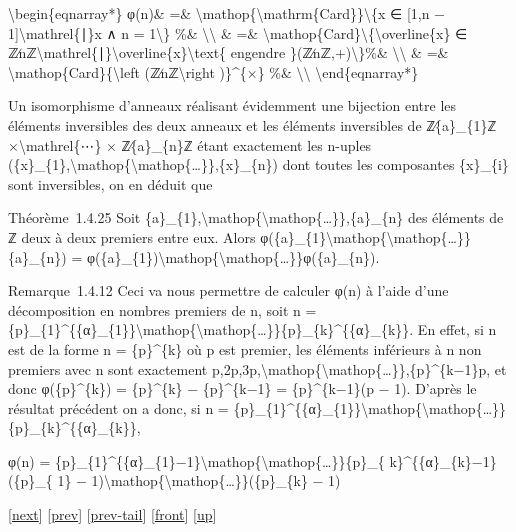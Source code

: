 \documentclass[]{article}
\begin{document}
\textbackslash{}begin\{eqnarray*\} φ(n)\& =\&
\textbackslash{}mathop\{\textbackslash{}mathrm\{Card\}\}\textbackslash{}\{x
∈ {[}1,n − 1{]}\textbackslash{}mathrel\{∣\}x ∧ n = 1\textbackslash{}\}
\%\& \textbackslash{}\textbackslash{} \& =\&
\textbackslash{}mathop\{Card\}\textbackslash{}\{\textbackslash{}overline\{x\}
∈
ℤ∕nℤ\textbackslash{}mathrel\{∣\}\textbackslash{}overline\{x\}\textbackslash{}text\{
engendre \}(ℤ∕nℤ,+)\textbackslash{}\}\%\&
\textbackslash{}\textbackslash{} \& =\&
\textbackslash{}mathop\{Card\}\{\textbackslash{}left
(ℤ∕nℤ\textbackslash{}right )\}\^{}\{×\} \%\&
\textbackslash{}\textbackslash{} \textbackslash{}end\{eqnarray*\}

Un isomorphisme d'anneaux réalisant évidemment une bijection entre les
éléments inversibles des deux anneaux et les éléments inversibles de
ℤ∕\{a\}\_\{1\}ℤ ×\textbackslash{}mathrel\{⋯\} × ℤ∕\{a\}\_\{n\}ℤ étant
exactement les n-uples
(\{x\}\_\{1\},\textbackslash{}mathop\{\textbackslash{}mathop\{\ldots{}\}\},\{x\}\_\{n\})
dont toutes les composantes \{x\}\_\{i\} sont inversibles, on en déduit
que

Théorème~1.4.25 Soit
\{a\}\_\{1\},\textbackslash{}mathop\{\textbackslash{}mathop\{\ldots{}\}\},\{a\}\_\{n\}
des éléments de ℤ deux à deux premiers entre eux. Alors
φ(\{a\}\_\{1\}\textbackslash{}mathop\{\textbackslash{}mathop\{\ldots{}\}\}\{a\}\_\{n\})
=
φ(\{a\}\_\{1\})\textbackslash{}mathop\{\textbackslash{}mathop\{\ldots{}\}\}φ(\{a\}\_\{n\}).

Remarque~1.4.12 Ceci va nous permettre de calculer φ(n) à l'aide d'une
décomposition en nombres premiers de n, soit n =
\{p\}\_\{1\}\^{}\{\{α\}\_\{1\}\}\textbackslash{}mathop\{\textbackslash{}mathop\{\ldots{}\}\}\{p\}\_\{k\}\^{}\{\{α\}\_\{k\}\}.
En effet, si n est de la forme n = \{p\}\^{}\{k\} où p est premier, les
éléments inférieurs à n non premiers avec n sont exactement
p,2p,3p,\textbackslash{}mathop\{\textbackslash{}mathop\{\ldots{}\}\},\{p\}\^{}\{k−1\}p,
et donc φ(\{p\}\^{}\{k\}) = \{p\}\^{}\{k\} − \{p\}\^{}\{k−1\} =
\{p\}\^{}\{k−1\}(p − 1). D'après le résultat précédent on a donc, si n =
\{p\}\_\{1\}\^{}\{\{α\}\_\{1\}\}\textbackslash{}mathop\{\textbackslash{}mathop\{\ldots{}\}\}\{p\}\_\{k\}\^{}\{\{α\}\_\{k\}\},

φ(n) =
\{p\}\_\{1\}\^{}\{\{α\}\_\{1\}−1\}\textbackslash{}mathop\{\textbackslash{}mathop\{\ldots{}\}\}\{p\}\_\{
k\}\^{}\{\{α\}\_\{k\}−1\}(\{p\}\_\{ 1\} −
1)\textbackslash{}mathop\{\textbackslash{}mathop\{\ldots{}\}\}(\{p\}\_\{k\}
− 1)

{[}\href{coursse5.html}{next}{]} {[}\href{coursse3.html}{prev}{]}
{[}\href{coursse3.html\#tailcoursse3.html}{prev-tail}{]}
{[}\href{coursse4.html}{front}{]}
{[}\href{coursch2.html\#coursse4.html}{up}{]}
\end{document}
